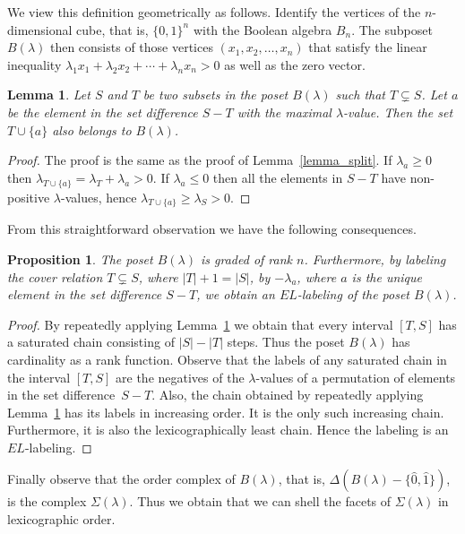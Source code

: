 \documentclass[10pt]{amsart}
\newtheorem{prop}[theorem]{Proposition}
\newtheorem{lemma}[theorem]{Lemma}
\theoremstyle{definition}
\newcommand{\hz}{\hat{0}}
\newcommand{\ho}{\hat{1}}
\begin{document}
We view this definition geometrically as follows.
Identify the vertices of the $n$-dimensional cube, that is,
$\{0,1\}^{n}$ with the Boolean algebra $B_{n}$.
The subposet $B(\lambda)$ then consists of those
vertices $(x_{1}, x_{2}, \ldots, x_{n})$
that satisfy the linear inequality
$\lambda_{1} x_{1} + \lambda_{2} x_{2} + \cdots + \lambda_{n} x_{n} > 0$
as well as the zero vector.
\begin{lemma}
Let $S$ and $T$ be two subsets in the poset $B(\lambda)$
such that $T \subsetneq S$. Let $a$ be the element
in the set difference $S-T$ with the maximal $\lambda$-value.
Then the set $T \cup \{a\}$ also belongs to $B(\lambda)$.
\label{lemma_one_step}
\end{lemma}
\begin{proof}
The proof is the same as the proof of
Lemma~\ref{lemma_split}.
If $\lambda_{a} \geq 0$ then
$\lambda_{T \cup \{a\}}
=
\lambda_{T}
+
\lambda_{a}
> 0$.
If $\lambda_{a} \leq 0$ then
all the elements in $S-T$ have non-positive $\lambda$-values,
hence
$\lambda_{T \cup \{a\}} \geq \lambda_{S} > 0$.
\end{proof}

From this straightforward observation we have
the following consequences.
\begin{prop}
The poset $B(\lambda)$ is graded of rank $n$.
Furthermore, by labeling the cover relation
$T \subsetneq S$, where $|T|+1=|S|$, 
by $-\lambda_{a}$, where $a$ is the unique element in the set difference
$S-T$, we obtain an $EL$-labeling of the poset $B(\lambda)$.
\end{prop}
\begin{proof}
By repeatedly applying Lemma~\ref{lemma_one_step}
we obtain that every interval $[T,S]$ has
a saturated chain consisting of $|S|-|T|$ steps.
Thus the poset $B(\lambda)$ has cardinality
as a rank function.
Observe that the labels of any saturated chain in the interval $[T,S]$
are the negatives
of the $\lambda$-values 
of a permutation of elements in the set difference~$S-T$.
Also, the chain obtained
by repeatedly applying Lemma~\ref{lemma_one_step}
has its labels
in increasing order.
It is the only such increasing chain. Furthermore,
it is also the lexicographically least chain.
Hence the labeling is an $EL$-labeling.
\end{proof}

Finally observe that
the order complex of $B(\lambda)$,
that is,
$\Delta(B(\lambda) - \{\hz,\ho\})$,
is the complex $\Sigma(\lambda)$.
Thus we obtain that 
we can shell the facets of $\Sigma(\lambda)$
in lexicographic order.
\end{document}

